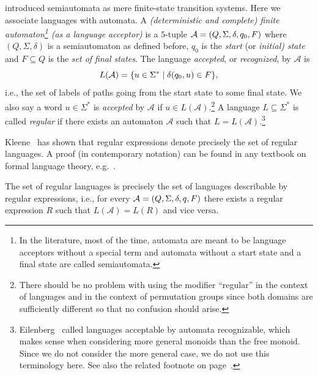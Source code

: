 
\label{def:automaton-acceptor}
 introduced semiautomata as mere finite-state transition systems.
Here we associate languages with automata.
A \emph{(deterministic and complete) finite automaton\footnote{In the literature, most of the time, automata are meant to be language
		acceptors without a special term and automata without
		a start state and a final state are called semiautomata.		
	} (as a language acceptor)} 
is a $5$-tuple $\mathcal A = (Q, \Sigma, \delta, q_0, F)$ 
where $(Q, \Sigma, \delta)$ is a semiautomaton as defined before, $q_0$
is the \emph{start} (or \emph{initial) state} and $F \subseteq Q$ is the \emph{set of final states}. 
The language \emph{accepted}, or \emph{recognized}, by $\mathcal A$
is
\[
L(\mathcal A) = \{ u \in \Sigma^* \mid \delta(q_0,u) \in F \}, \label{def:accepted_lang_aut}
\]
i.e., the set of labels of paths going from the start state to some final state.
We also say a word $u \in \Sigma^*$ is \emph{accepted} by $\mathcal A$ if $u \in L(\mathcal A)$.\footnote{There should be no problem with using the modifier ``regular'' in the context of languages and in the context of permutation groups since both domains are sufficiently different
so that no confusion should arise.}	
A language $L \subseteq \Sigma^*$ is called \emph{regular} if there exists an automaton $\mathcal A$ 
such that $L = L(\mathcal A)$.\footnote{Eilenberg~\cite{Eilenberg1974} called
	languages acceptable by automata recognizable,
	which makes sense when considering more general monoids
	than the free monoid. Since we do not consider the more general case,
	we do not use this terminology here.	
	See also the related footnote on page~\pageref{def:RegSigma}.}	

Kleene~\cite{Kleene56} has shown that regular expressions denote precisely
the set of regular languages. A proof (in contemporary notation)
can be found in any textbook on formal language theory, e.g.~\cite{HopUll79,Pin2022}.

\begin{theorem}
	The set of regular languages is precisely the set of languages
	describable by regular expressions, i.e., 
	for every $\mathcal A = (Q, \Sigma, \delta, q, F)$
	there exists a regular expression $R$ such that $L(\mathcal A) = L(R)$
	and vice versa.
\end{theorem}


